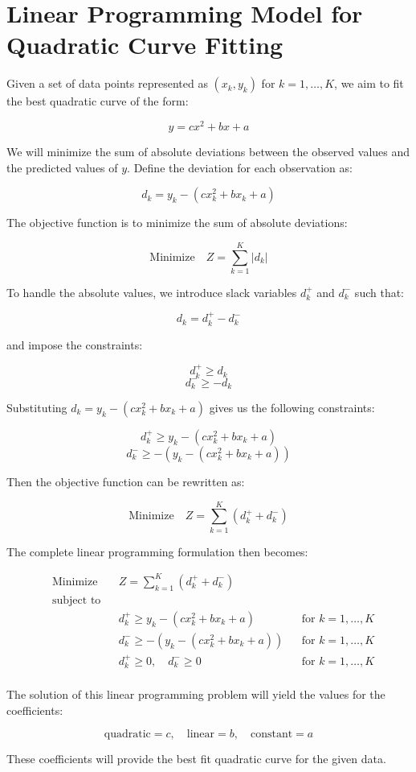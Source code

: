 \documentclass{article}
\begin{document}
\section*{Linear Programming Model for Quadratic Curve Fitting}

Given a set of data points represented as $(x_k, y_k)$ for $k = 1, \ldots, K$, we aim to fit the best quadratic curve of the form:

\[
y = c x^2 + b x + a
\]

We will minimize the sum of absolute deviations between the observed values and the predicted values of $y$. Define the deviation for each observation as:

\[
d_k = y_k - (c x_k^2 + b x_k + a)
\]

The objective function is to minimize the sum of absolute deviations:

\[
\text{Minimize} \quad Z = \sum_{k=1}^{K} |d_k|
\]

To handle the absolute values, we introduce slack variables $d_k^+$ and $d_k^-$ such that:

\[
d_k = d_k^+ - d_k^-
\]

and impose the constraints:

\[
d_k^+ \geq d_k
\]
\[
d_k^- \geq -d_k
\]

Substituting $d_k = y_k - (c x_k^2 + b x_k + a)$ gives us the following constraints:

\[
d_k^+ \geq y_k - (c x_k^2 + b x_k + a)
\]
\[
d_k^- \geq -(y_k - (c x_k^2 + b x_k + a))
\]

Then the objective function can be rewritten as:

\[
\text{Minimize} \quad Z = \sum_{k=1}^{K} (d_k^+ + d_k^-)
\]

The complete linear programming formulation then becomes:

\[
\begin{aligned}
& \text{Minimize} && Z = \sum_{k=1}^{K} (d_k^+ + d_k^-) \\
& \text{subject to} \\
& && d_k^+ \geq y_k - (c x_k^2 + b x_k + a) && \text{for } k = 1, \ldots, K \\
& && d_k^- \geq - (y_k - (c x_k^2 + b x_k + a)) && \text{for } k = 1, \ldots, K \\
& && d_k^+ \geq 0, \quad d_k^- \geq 0 && \text{for } k = 1, \ldots, K \\
\end{aligned}
\]

The solution of this linear programming problem will yield the values for the coefficients:

\[
\text{quadratic} = c, \quad \text{linear} = b, \quad \text{constant} = a
\]

These coefficients will provide the best fit quadratic curve for the given data.
\end{document}
